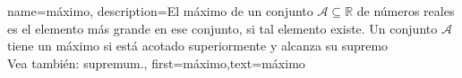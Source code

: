 
{name=máximo,
     description={El máximo de un conjunto $\mathcal{A} \subseteq \mathbb{R}$ 
	 de números reales es el elemento más grande en ese conjunto, si tal elemento existe. Un conjunto $\mathcal{A}$ 
	 tiene un máximo si está acotado superiormente y alcanza su supremo \cite[Sec.~1.4]{RudinBookPrinciplesMatheAnalysis}
	 \\
		Vea también: \gls{supremum}.},
 first={máximo},text={máximo}
}

